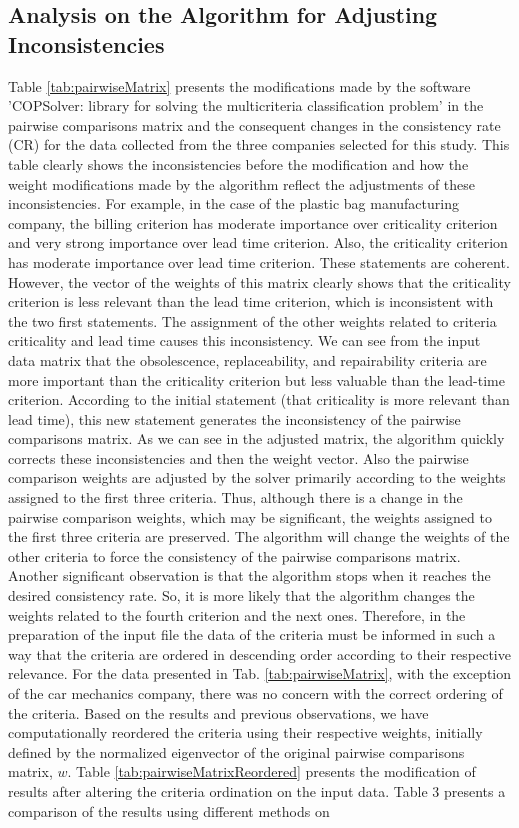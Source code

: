 \documentclass[10pt,fleqn,a4paper,twoside]{article}
\begin{document}
    \subsection{Analysis on the Algorithm for Adjusting Inconsistencies}
    
    Table \ref{tab:pairwiseMatrix} presents the modifications made by the software 'COPSolver: library for solving the multicriteria classification problem' in the pairwise comparisons matrix and the consequent changes in the consistency rate (CR) for the data collected from the three companies selected for this study. This table clearly shows the inconsistencies before the modification and how the weight modifications made by the algorithm reflect the adjustments of these inconsistencies. For example, in the case of the plastic bag manufacturing company, the billing criterion has moderate importance over criticality criterion and very strong importance over lead time criterion. Also, the criticality criterion has moderate importance over lead time criterion. These statements are coherent. However, the vector of the weights of this matrix clearly shows that the criticality criterion is less relevant than the lead time criterion, which is inconsistent with the two first statements. The assignment of the other weights related to criteria criticality and lead time causes this inconsistency. We can see from the input data matrix that the obsolescence, replaceability, and repairability criteria are more important than the criticality criterion but less valuable than the lead-time criterion. According to the initial statement (that criticality is more relevant than lead time), this new statement generates the inconsistency of the pairwise comparisons matrix. As we can see in the adjusted matrix, the algorithm quickly corrects these inconsistencies and then the weight vector. Also the pairwise comparison weights are adjusted by the solver primarily according to the weights assigned to the first three criteria. Thus, although there is a change in the pairwise comparison weights, which may be significant, the weights assigned to the first three criteria are preserved. The algorithm will change the weights of the other criteria to force the consistency of the pairwise comparisons matrix. Another significant observation is that the algorithm stops when it reaches the desired consistency rate. So, it is more likely that the algorithm changes the weights related to the fourth criterion and the next ones. Therefore, in the preparation of the input file the data of the criteria must be informed in such a way that the criteria are ordered in descending order according to their respective relevance. For the data presented in Tab. \ref{tab:pairwiseMatrix}, with the exception of the car mechanics company, there was no concern with the correct ordering of the criteria. Based on the results and previous observations, we have computationally reordered the criteria using their respective weights, initially defined by the normalized eigenvector of the original pairwise comparisons matrix, $w$. Table \ref{tab:pairwiseMatrixReordered} presents the modification of results after altering the criteria ordination on the input data. Table 3 presents a comparison of the results using different methods on 
\end{document}
